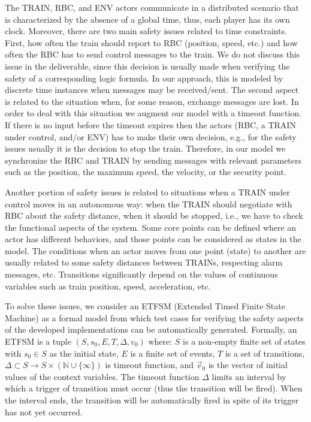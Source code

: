 \documentclass{template/openetcs_article}
\begin{document}
The TRAIN, RBC, and ENV actors communicate in a distributed scenario that is characterized by the absence of a global time, thus, each player has its own clock. Moreover, there are two main safety issues related to time constraints. First, how often the train should report to RBC (position, speed, etc.) and how often the RBC has to send control messages to the train. We do not discuss this issue in the deliverable, since this decision is usually made when verifying the safety of a corresponding logic formula. In our approach, this is modeled by discrete time instances when messages may be received/sent. The second aspect is related to the situation when, for some reason, exchange messages are lost. In order to deal with this situation we augment our model with a timeout function. If there is no input before the timeout expires then the actors (RBC, a TRAIN under control, and/or ENV) has to make their own decision, e.g., for the safety issues usually it is the decision to stop the train. Therefore, in our model we synchronize the RBC and TRAIN by sending messages with relevant parameters such as the position, the maximum speed, the velocity, or the security point. 

Another portion of safety issues is related to situations when a TRAIN under control moves in an autonomous way: when the TRAIN should negotiate with RBC about the safety distance, when it should be stopped, i.e., we have to check the functional aspects of the system. Some core points can be defined where an actor has different behaviors, and those points can be considered as states in the model. The conditions when an actor moves from one point (state) to another are usually related to some safety distances between TRAINs, respecting alarm messages, etc. Transitions significantly depend on the values of continuous variables such as train position, speed, acceleration, etc. 

To solve these issues, we consider an ETFSM (Extended Timed Finite State Machine) as a formal model from which test cases for verifying the safety aspects of the developed implementations can be automatically generated. 
Formally, 
    an ETFSM is a tuple 
    $(S, s_0, E, T,  \Delta, v_0)$ where:
    $S$ is a non-empty finite set of states with $s_0 \in S$ as the
        initial state,
 $E$ is a finite set of events,
 $T$ is a set of transitions, 
 $\Delta \subset S \to S \times (\mathbb{N} \cup \{ \infty \})$ is timeout function, and
 $\vec{v}_0$ is the vector of initial values of the context variables.
The timeout function $\Delta$ limits an interval by which a trigger of transition must occur (thus the transition will be fired). When the interval ends, the transition will be automatically fired in spite of its trigger has not yet occurred. 
\end{document}
